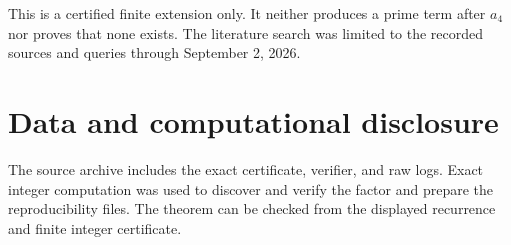 \documentclass[11pt]{amsart}
\begin{document}
This is a certified finite extension only. It neither produces a prime term
after $a_4$ nor proves that none exists. The literature search was limited to
the recorded sources and queries through September 2, 2026.
\section*{Data and computational disclosure}
The source archive includes the exact certificate, verifier, and raw logs.
Exact integer computation was used to discover and verify the
factor and prepare the reproducibility files. The theorem can be checked from
the displayed recurrence and finite integer certificate.

\end{document}

